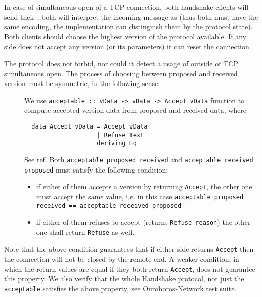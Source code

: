 In case of simultaneous open of a TCP connection, both handshake clients will
send their \MsgProposeVersions{}, both will interpret the incoming message as
\MsgReplyVersions{} (thus both must have the same encoding, the implementation
can distinguish them by the protocol state).  Both clients should choose the
highest version of the protocol available.  If any side does not accept any
version (or its parameters) it can reset the connection.

The protocol does not forbid, nor could it detect a usage of
\MsgReplyVersions{} outside of TCP simultaneous open.  The process of
choosing between proposed and received version must be symmetric, in the
following sense:

\begin{description}
  \item[]
    We use \texttt{acceptable :: vData -> vData -> Accept vData}
    function to compute accepted version data from proposed and received data,
    where
\begin{verbatim}
  data Accept vData = Accept vData
                    | Refuse Text
                    deriving Eq
\end{verbatim}
    See
    \href{https://input-output-hk.github.io/ouroboros-network/ouroboros-network-framework/Ouroboros-Network-Protocol-Handshake-Version.html#t:Acceptable}{ref}.
    Both \texttt{acceptable proposed received} and \texttt{acceptable received
    proposed} must satisfy the following condition:
    \begin{itemize}
      \item if either of them accepts a version by returning \texttt{Accept},
        the other one must accept the same value, i.e. in this case
        \texttt{acceptable proposed received == acceptable received proposed}
      \item if either of them refuses to accept (returns \texttt{Refuse reason})
        the other one shall return \texttt{Refuse} as well.
    \end{itemize}
\end{description}
Note that the above condition guarantees that if either side returns
\texttt{Accept} then the connection will not be closed by the remote end.
A weaker condition, in which the return values are equal if they both return
\texttt{Accept}, does not guarantee this property.  We also verify that the
whole Handshake protocol, not just the \texttt{acceptable} satisfies the above
property, see
\href{https://github.com/input-output-hk/ouroboros-network/blob/master/ouroboros-network/protocol-tests/Ouroboros/Network/Protocol/Handshake/Test.hs}{Ouroboros-Network
test suite}.

